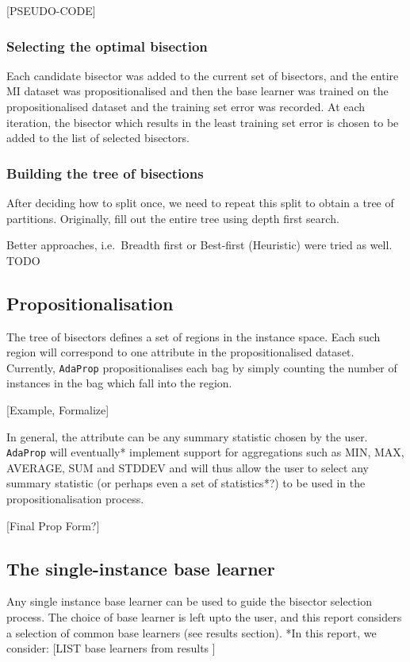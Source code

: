 \documentclass[a4paper,12pt]{article} %
\newcommand{\AdaProp}{\texttt{AdaProp}\xspace}
\begin{document}
[PSEUDO-CODE]

\subsubsection{Selecting the optimal bisection}
Each candidate bisector was added to the current set of bisectors,
    and the entire MI dataset was propositionalised and then
    the base learner was trained on the propositionalised dataset
    and the training set error was recorded.
At each iteration, the bisector which results in the least training set error 
    is chosen to be added to the list of selected bisectors.

\subsubsection{Building the tree of bisections}

After deciding how to split once, we need to repeat this split to obtain a tree of partitions.
Originally, fill out the entire tree using depth first search.

Better approaches, i.e.\ Breadth first or Best-first (Heuristic) were tried as well. TODO

\subsection{Propositionalisation}
The tree of bisectors defines a set of regions in the instance space.
Each such region will correspond to one attribute in the propositionalised dataset.
Currently, \AdaProp propositionalises each bag 
    by simply counting the number of instances in the bag which fall into the region.
    
[Example, Formalize] 

In general, the attribute can be any summary statistic chosen by the user.
\AdaProp will eventually* implement support for aggregations such as 
    MIN, MAX, AVERAGE, SUM and STDDEV and 
    will thus allow the user to select any summary statistic 
    (or perhaps even a set of statistics*?) 
    to be used in the propositionalisation process.
    
[Final Prop Form?]
    

\subsection{The single-instance base learner}    
Any single instance base learner can be used to guide the bisector selection process.
The choice of base learner is left upto the user, and 
    this report considers a selection of common base learners (see results section).
*In this report, we consider: [LIST base learners from results ]    
\end{document}
